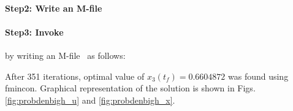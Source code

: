 \documentclass[a4paper,12pt,oneside]{book}
\begin{document}
{\small }

\paragraph{Step2: Write an M-file~}

{\small }

\paragraph{Step3: Invoke~} by writing an
M-file~ as follows:

{\small }


After 351 iterations, optimal value of $x_{3}(t_{f}) = 0.6604872$ was
found using fmincon. Graphical representation of the solution is shown in Figs. \ref{fig:probdenbigh_u}
and \ref{fig:probdenbigh_x}.
\end{document}
